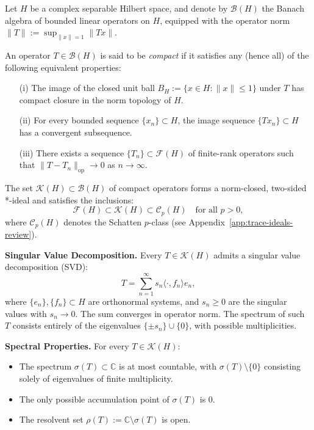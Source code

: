 \begin{definition}\label{def:compact_operator}
Let \( H \) be a complex separable Hilbert space, and denote by \( \mathcal{B}(H) \) the Banach algebra of bounded linear operators on \( H \), equipped with the operator norm \( \|T\| := \sup_{\|x\|=1} \|Tx\| \).

An operator \( T \in \mathcal{B}(H) \) is said to be \emph{compact} if it satisfies any (hence all) of the following equivalent properties:
\begin{enumerate}
    \item[\textup{(i)}] The image of the closed unit ball \( B_H := \{ x \in H : \|x\| \leq 1 \} \) under \( T \) has compact closure in the norm topology of \( H \).
    \item[\textup{(ii)}] For every bounded sequence \( \{x_n\} \subset H \), the image sequence \( \{Tx_n\} \subset H \) has a convergent subsequence.
    \item[\textup{(iii)}] There exists a sequence \( \{T_n\} \subset \mathcal{F}(H) \) of finite-rank operators such that \( \|T - T_n\|_{\mathrm{op}} \to 0 \) as \( n \to \infty \).
\end{enumerate}

The set \( \mathcal{K}(H) \subset \mathcal{B}(H) \) of compact operators forms a norm-closed, two-sided *-ideal and satisfies the inclusions:
\[
\mathcal{F}(H) \subset \mathcal{K}(H) \subset \mathcal{C}_p(H) \quad \text{for all } p > 0,
\]
where \( \mathcal{C}_p(H) \) denotes the Schatten \( p \)-class (see Appendix~\ref{app:trace-ideals-review}).

\medskip
\noindent\textbf{Singular Value Decomposition.}
Every \( T \in \mathcal{K}(H) \) admits a singular value decomposition (SVD):
\[
T = \sum_{n=1}^\infty s_n \langle \cdot, f_n \rangle e_n,
\]
where \( \{e_n\}, \{f_n\} \subset H \) are orthonormal systems, and \( s_n \geq 0 \) are the singular values with \( s_n \to 0 \). The sum converges in operator norm. The spectrum of such \( T \) consists entirely of the eigenvalues \( \{\pm s_n\} \cup \{0\} \), with possible multiplicities.

\medskip
\noindent\textbf{Spectral Properties.}
For every \( T \in \mathcal{K}(H) \):
\begin{itemize}
    \item The spectrum \( \sigma(T) \subset \mathbb{C} \) is at most countable, with \( \sigma(T) \setminus \{0\} \) consisting solely of eigenvalues of finite multiplicity.
    \item The only possible accumulation point of \( \sigma(T) \) is \( 0 \).
    \item The resolvent set \( \rho(T) := \mathbb{C} \setminus \sigma(T) \) is open.
\end{itemize}


\end{definition}
